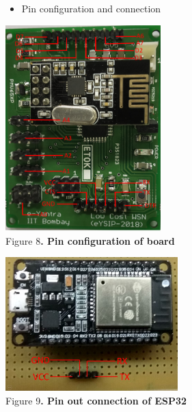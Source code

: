 \documentclass[a4paper,12pt,oneside]{book}
\begin{document}
\begin{itemize}
\item Pin configuration and connection 
\end{itemize}
\begin{center}
\includegraphics[width=0.45\textwidth]{pinout.PNG}\\
         \small{Figure 8\textbf{. Pin configuration of board}}\\
\end{center}


\begin{center}
\includegraphics[width=0.5\textwidth]{pinout_1.PNG}\\
         \small{Figure 9\textbf{. Pin out connection of ESP32}}\\
\end{center}
\end{document}
